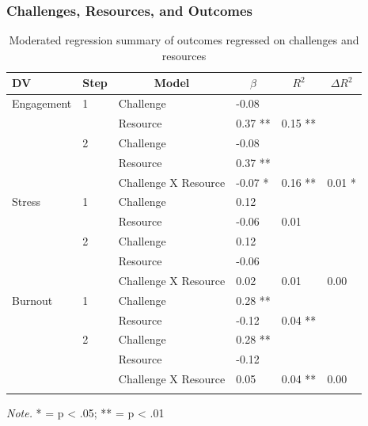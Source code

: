 \documentclass[
  man,mask]{apa7}
\begin{document}
\hypertarget{challenges-resources-and-outcomes}{%
\subsubsection{Challenges, Resources, and Outcomes}\label{challenges-resources-and-outcomes}}

\begin{table}[tbp]

\begin{center}
\begin{threeparttable}

\caption{\label{tab:chal-resource-table}Moderated regression summary of outcomes regressed on challenges and resources}

\begin{tabular}{llllll}
\toprule
DV & \multicolumn{1}{c}{Step} & \multicolumn{1}{c}{Model} & \multicolumn{1}{c}{$\beta$} & \multicolumn{1}{c}{$R^2$} & \multicolumn{1}{c}{$\Delta R^2$}\\
\midrule
Engagement & 1 & Challenge & -0.08 &  & \\
 &  & Resource & 0.37 ** & 0.15 ** & \\
 & 2 & Challenge & -0.08 &  & \\
 &  & Resource & 0.37 ** &  & \\
 &  & Challenge X Resource & -0.07 * & 0.16 ** & 0.01 *\\
Stress & 1 & Challenge & 0.12 &  & \\
 &  & Resource & -0.06 & 0.01 & \\
 & 2 & Challenge & 0.12 &  & \\
 &  & Resource & -0.06 &  & \\
 &  & Challenge X Resource & 0.02 & 0.01 & 0.00\\
Burnout & 1 & Challenge & 0.28 ** &  & \\
 &  & Resource & -0.12 & 0.04 ** & \\
 & 2 & Challenge & 0.28 ** &  & \\
 &  & Resource & -0.12 &  & \\
 &  & Challenge X Resource & 0.05 & 0.04 ** & 0.00\\
\bottomrule
\addlinespace
\end{tabular}

\begin{tablenotes}[para]
\normalsize{\textit{Note.} * = p < .05; ** = p < .01}
\end{tablenotes}

\end{threeparttable}
\end{center}

\end{table}
\end{document}

